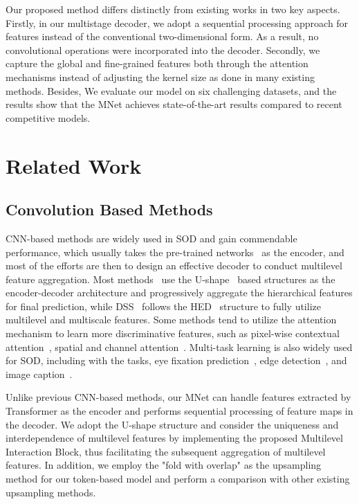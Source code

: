 \documentclass[lettersize,journal]{IEEEtran}
\begin{document}
Our proposed method differs distinctly from existing works in two key aspects. 
Firstly, in our multistage decoder, we adopt a sequential processing approach for features instead of the conventional two-dimensional form. As a result, no convolutional operations were incorporated into the decoder. 
Secondly, we capture the global and fine-grained features both through the attention mechanisms instead of adjusting the kernel size as done in many existing methods. 
Besides, We evaluate our model on six challenging datasets, and the results show that the MNet achieves state-of-the-art results compared to recent competitive models. 



\section{Related Work}

\subsection{Convolution Based Methods}
CNN-based methods are widely used in SOD and gain commendable performance, which usually takes the pre-trained networks~\cite{ResNet,VGG} as the encoder, and most of the efforts are then to design an effective decoder to conduct multilevel feature aggregation. Most methods~\cite{MiNet,Amulet,GateNet} use the U-shape~\cite{Unet} based structures as the encoder-decoder architecture and progressively aggregate the hierarchical features for final prediction, while DSS~\cite{DSS} follows the HED~\cite{HED} structure to fully utilize multilevel and multiscale features. Some methods tend to utilize the attention mechanism to learn more discriminative features, such as pixel-wise contextual attention~\cite{PiCANet}, spatial and channel attention~\cite{PAGRN}. Multi-task learning is also widely used for SOD, including with the tasks, eye fixation prediction~\cite{ASNet,Saliency_unified}, edge detection~\cite{BASNet,EGNet,wei2020label,9036909}, and image caption~\cite{Capsal}. 

Unlike previous CNN-based methods, our MNet can handle features extracted by Transformer as the encoder and performs sequential processing of feature maps in the decoder. We adopt the U-shape structure and consider the uniqueness and interdependence of multilevel features by implementing the proposed Multilevel Interaction Block, thus facilitating the subsequent aggregation of multilevel features. In addition, we employ the "fold with overlap" as the upsampling method for our token-based model and perform a comparison with other existing upsampling methods. 
\end{document}
